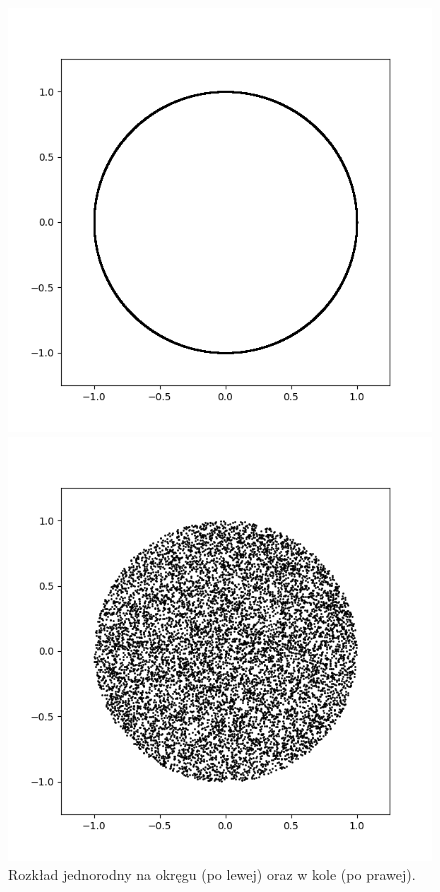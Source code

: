 \documentclass[a4paper,12pt,twoside]{article}
\begin{document}
 \begin{figure}[h!]
    \begin{minipage}{0.55\textwidth}
        \centering
        \includegraphics[scale = 0.5]{Carlo_2.png}
    \end{minipage}
    \begin{minipage}{0.55\textwidth}
        \includegraphics[scale = 0.5]{Carlo_3.png}
    \end{minipage}
    \caption{Rozkład jednorodny na okręgu (po lewej) oraz w kole (po prawej).  }
\end{figure}
\end{document}
